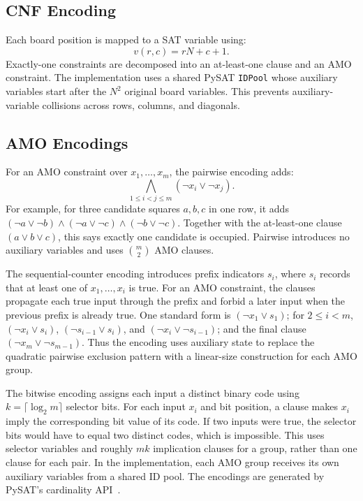 \documentclass[a4paper,fleqn]{cas-sc}
\begin{document}
\subsection{CNF Encoding}

Each board position is mapped to a SAT variable using:
\begin{equation}
v(r,c) = rN+c+1.
\end{equation}
Exactly-one constraints are decomposed into an at-least-one clause and an AMO constraint. The implementation uses a shared PySAT \texttt{IDPool} whose auxiliary variables start after the $N^2$ original board variables. This prevents auxiliary-variable collisions across rows, columns, and diagonals.

\subsection{AMO Encodings}

For an AMO constraint over $x_1,\ldots,x_m$, the pairwise encoding adds:
\begin{equation}
\bigwedge_{1 \le i < j \le m}(\lnot x_i \lor \lnot x_j).
\end{equation}
For example, for three candidate squares $a,b,c$ in one row, it adds $(\lnot a\lor\lnot b)\land(\lnot a\lor\lnot c)\land(\lnot b\lor\lnot c)$. Together with the at-least-one clause $(a\lor b\lor c)$, this says exactly one candidate is occupied. Pairwise introduces no auxiliary variables and uses $\binom{m}{2}$ AMO clauses.

The sequential-counter encoding introduces prefix indicators $s_i$, where $s_i$ records that at least one of $x_1,\ldots,x_i$ is true. For an AMO constraint, the clauses propagate each true input through the prefix and forbid a later input when the previous prefix is already true. One standard form is $(\lnot x_1\lor s_1)$; for $2\le i<m$, $(\lnot x_i\lor s_i)$, $(\lnot s_{i-1}\lor s_i)$, and $(\lnot x_i\lor\lnot s_{i-1})$; and the final clause $(\lnot x_m\lor\lnot s_{m-1})$. Thus the encoding uses auxiliary state to replace the quadratic pairwise exclusion pattern with a linear-size construction for each AMO group.

The bitwise encoding assigns each input a distinct binary code using $k=\lceil\log_2 m\rceil$ selector bits. For each input $x_i$ and bit position, a clause makes $x_i$ imply the corresponding bit value of its code. If two inputs were true, the selector bits would have to equal two distinct codes, which is impossible. This uses selector variables and roughly $mk$ implication clauses for a group, rather than one clause for each pair. In the implementation, each AMO group receives its own auxiliary variables from a shared ID pool. The encodings are generated by PySAT's cardinality API~\citep{pysatcard}.
\end{document}
